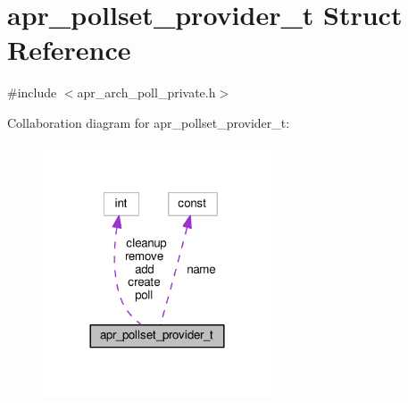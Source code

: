 \hypertarget{structapr__pollset__provider__t}{}\section{apr\+\_\+pollset\+\_\+provider\+\_\+t Struct Reference}
\label{structapr__pollset__provider__t}


{\ttfamily \#include $<$apr\+\_\+arch\+\_\+poll\+\_\+private.\+h$>$}



Collaboration diagram for apr\+\_\+pollset\+\_\+provider\+\_\+t\+:
\nopagebreak
\begin{figure}[H]
\begin{center}
\leavevmode
\includegraphics[width=192pt]{structapr__pollset__provider__t__coll__graph}
\end{center}
\end{figure}
